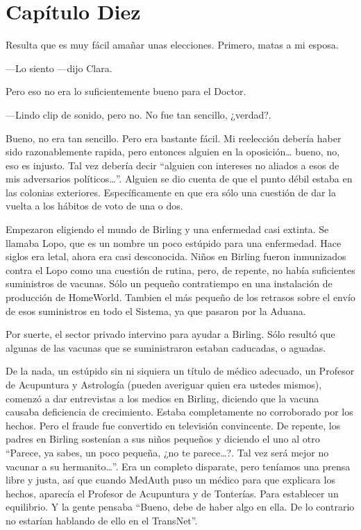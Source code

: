 \chapter*{Capítulo Diez}

Resulta que es muy fácil amañar unas elecciones. Primero, matas a mi
esposa.

---Lo siento ---dijo Clara.

Pero eso no era lo suficientemente bueno para el Doctor.

---Lindo clip de sonido, pero no. No fue tan sencillo, ¿verdad?.

Bueno, no era tan sencillo. Pero era bastante fácil. Mi reelección
debería haber sido razonablemente rapida, pero entonces alguien en la
oposición\ldots{} bueno, no, eso es injusto. Tal vez debería decir
``alguien con intereses no aliados a esos de mis adversarios
políticos\ldots{}''. Alguien se dio cuenta de que el punto débil estaba
en las colonias exteriores. Específicamente en que era sólo una cuestión
de dar la vuelta a los hábitos de voto de una o dos.

Empezaron eligiendo el mundo de Birling y una enfermedad casi extinta.
Se llamaba Lopo, que es un nombre un poco estúpido para una enfermedad.
Hace siglos era letal, ahora era casi desconocida. Niños en Birling
fueron inmunizados contra el Lopo como una cuestión de rutina, pero, de
repente, no había suficientes suministros de vacunas. Sólo un pequeño
contratiempo en una instalación de producción de HomeWorld. Tambien el
más pequeño de los retrasos sobre el envío de esos suministros en todo
el Sistema, ya que pasaron por la Aduana.

Por suerte, el sector privado intervino para ayudar a Birling. Sólo
resultó que algunas de las vacunas que se suministraron estaban
caducadas, o aguadas.

De la nada, un estúpido sin ni siquiera un título de médico adecuado, un
Profesor de Acupuntura y Astrología (pueden averiguar quien era ustedes
mismos), comenzó a dar entrevistas a los medios en Birling, diciendo que
la vacuna causaba deficiencia de crecimiento. Estaba completamente no
corroborado por los hechos. Pero el fraude fue convertido en televisión
convincente. De repente, los padres en Birling sostenían a sus niños
pequeños y diciendo el uno al otro ``Parece, ya sabes, un poco pequeña,
¿no te parece\ldots{}?. Tal vez será mejor no vacunar a su
hermanito\ldots{}''. Era un completo disparate, pero teníamos una prensa
libre y justa, así que cuando MedAuth puso un médico para que explicara
los hechos, aparecía el Profesor de Acupuntura y de Tonterías. Para
establecer un equilibrio. Y la gente pensaba ``Bueno, debe de haber algo
en ella. De lo contrario no estarían hablando de ello en el TransNet''.

